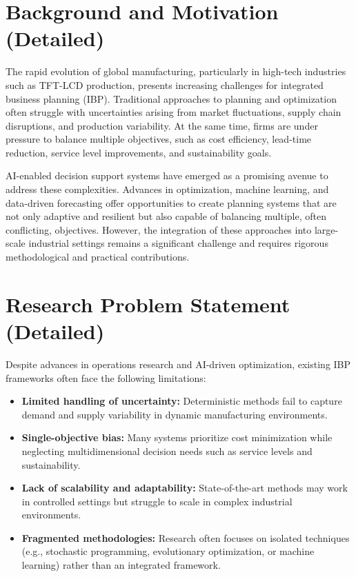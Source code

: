 \documentclass[12pt,a4paper]{article}
\begin{document}
\section{Background and Motivation (Detailed)}

The rapid evolution of global manufacturing, particularly in high-tech industries such as TFT-LCD production, presents increasing challenges for integrated business planning (IBP). Traditional approaches to planning and optimization often struggle with uncertainties arising from market fluctuations, supply chain disruptions, and production variability. At the same time, firms are under pressure to balance multiple objectives, such as cost efficiency, lead-time reduction, service level improvements, and sustainability goals.

AI-enabled decision support systems have emerged as a promising avenue to address these complexities. Advances in optimization, machine learning, and data-driven forecasting offer opportunities to create planning systems that are not only adaptive and resilient but also capable of balancing multiple, often conflicting, objectives. However, the integration of these approaches into large-scale industrial settings remains a significant challenge and requires rigorous methodological and practical contributions.

\section{Research Problem Statement (Detailed)}

Despite advances in operations research and AI-driven optimization, existing IBP frameworks often face the following limitations:

\begin{itemize}[leftmargin=*]
    \item \textbf{Limited handling of uncertainty:} Deterministic methods fail to capture demand and supply variability in dynamic manufacturing environments.
    
    \item \textbf{Single-objective bias:} Many systems prioritize cost minimization while neglecting multidimensional decision needs such as service levels and sustainability.
    
    \item \textbf{Lack of scalability and adaptability:} State-of-the-art methods may work in controlled settings but struggle to scale in complex industrial environments.
    
    \item \textbf{Fragmented methodologies:} Research often focuses on isolated techniques (e.g., stochastic programming, evolutionary optimization, or machine learning) rather than an integrated framework.
\end{itemize}
\end{document}
